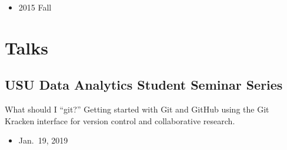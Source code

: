 \documentclass[11pt,a4paper,]{moderncv}
\providecommand{\tightlist}{%
	\setlength{\itemsep}{0pt}\setlength{\parskip}{0pt}}
\begin{document}
\begin{itemize}
\tightlist
\item
  2015 Fall
\end{itemize}

\vspace{1.5cm}

\hypertarget{talks}{%
\section{Talks}\label{talks}}

\hypertarget{usu-data-analytics-student-seminar-series}{%
\subsection{USU Data Analytics Student Seminar
Series}\label{usu-data-analytics-student-seminar-series}}

What should I ``git?'' Getting started with Git and GitHub using the Git
Kracken interface for version control and collaborative research.

\begin{itemize}
\tightlist
\item
  Jan.~19, 2019
\end{itemize}
\end{document}
